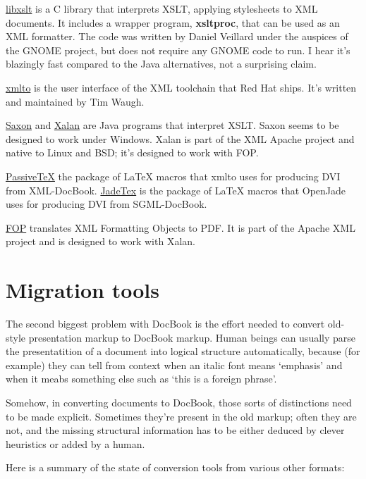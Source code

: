 \documentclass[pdftex,english,a4paper,10pt]{infocom}
\begin{document}
\href{http://xmlsoft.org/XSLT/}{libxslt} is a C
library that interprets XSLT, applying stylesheets to XML documents.
It includes a wrapper program, {\bf xsltproc}, that can be
used as an XML formatter.  The code was written by Daniel Veillard
under the auspices of the GNOME project, but does not require any
GNOME code to run.  I hear it's blazingly fast compared to the 
Java alternatives, not a surprising claim.

\href{http://cyberelk.net/tim/xmlto/}{xmlto} is the
user interface of the XML toolchain that Red Hat ships.  It's written
and maintained by Tim Waugh.

\href{http://users.iclway.co.uk/mhkay/saxon/}{Saxon}
and \href{http://xml.apache.org/xalan-j/}{Xalan} are Java
programs that interpret XSLT.  Saxon seems to be designed to work
under Windows.  Xalan is part of the XML Apache project and native to
Linux and BSD; it's designed to work with FOP.

\href{http://users.ox.ac.uk/~rahtz/passivetex/}{PassiveTeX} the
package of LaTeX macros that xmlto uses for
producing DVI from XML-DocBook. \href{http://jadetex.sourceforge.net/}{JadeTex} is the package
of LaTeX macros that OpenJade uses for producing DVI from
SGML-DocBook.

\href{http://xml.apache.org/fop/}{FOP} translates
XML Formatting Objects to PDF.  It is part of the Apache XML project
and is designed to work with Xalan.

\section{Migration tools}
\label{id2719718}\hypertarget{id2719718}{}%

The second biggest problem with DocBook is the effort needed to
convert old-style presentation markup to DocBook markup.  Human beings
can usually parse the presentatition of a document into logical
structure automatically, because (for example) they can tell from 
context when an italic font means `emphasis' and when it meabs
something else such as `this is a foreign phrase'.

Somehow, in converting documents to DocBook, those
sorts of distinctions need to be made explicit.  Sometimes
they're present in the old markup; often they are not, and the
missing  structural information has to be either deduced by 
clever heuristics or added by a human.

Here is a summary of the state of conversion tools from
various other formats:
\end{document}
